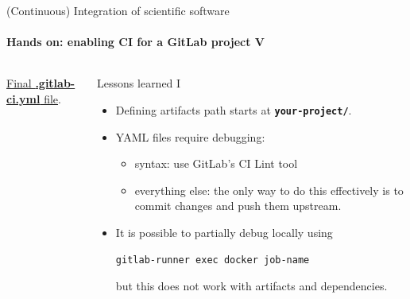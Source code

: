 \begin{frame}[fragile]{(Continuous) Integration of scientific software} 
    \framesubtitle{Hands on: enabling CI for a GitLab project V} 
    \vfill

    \begin{columns}
        \begin{column}[c]{0.3\textwidth}
    \href{https://gitlab.com/tmaric/minimal-cse-ci-examples/-/blob/01-with-ci/.gitlab-ci.yml}{Final \textbf{.gitlab-ci.yml} file}. 
        \end{column}
        \begin{column}[c]{0.7\textwidth}
            Lessons learned I
            \begin{itemize}
                \item Defining artifacts path starts at \textbf{\texttt{your-project/}}.
                \item YAML files require debugging:
                    \begin{itemize}
                        \item syntax: use GitLab's CI Lint tool 
                        \item everything else: the only way to do this effectively is to commit changes and push them upstream.
                    \end{itemize}
                \item It is possible to partially debug locally using 
                    \begin{verbatim}
gitlab-runner exec docker job-name
                    \end{verbatim}
                    but this does not work with artifacts and dependencies.
            \end{itemize}
        \end{column}
    \end{columns}

\end{frame}

